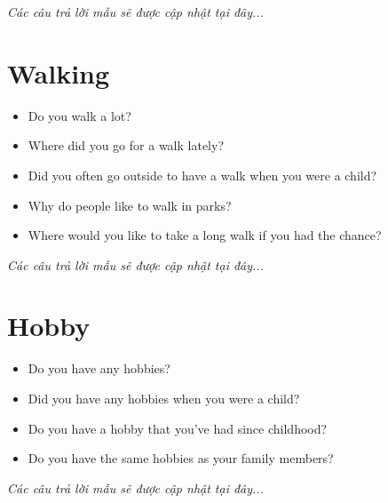 \vspace{1em}
\textit{Các câu trả lời mẫu sẽ được cập nhật tại đây...}
\vspace{2em}

\section{Walking}
\begin{ieltsprompt}
\begin{itemize}[itemsep=4pt]
    \item Do you walk a lot?
    \item Where did you go for a walk lately?
    \item Did you often go outside to have a walk when you were a child?
    \item Why do people like to walk in parks?
    \item Where would you like to take a long walk if you had the chance?
\end{itemize}
\end{ieltsprompt}

\vspace{1em}
\textit{Các câu trả lời mẫu sẽ được cập nhật tại đây...}
\vspace{2em}

\section{Hobby}
\begin{ieltsprompt}
\begin{itemize}[itemsep=4pt]
    \item Do you have any hobbies?
    \item Did you have any hobbies when you were a child?
    \item Do you have a hobby that you've had since childhood?
    \item Do you have the same hobbies as your family members?
\end{itemize}
\end{ieltsprompt}

\vspace{1em}
\textit{Các câu trả lời mẫu sẽ được cập nhật tại đây...}
\vspace{2em}

